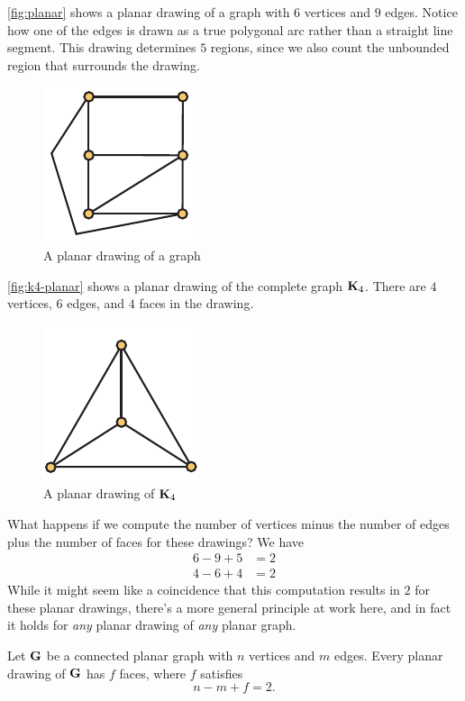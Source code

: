 \autoref{fig:planar} shows a planar drawing of a graph with $6$
vertices and $9$ edges. Notice how one of the edges is drawn as a true
polygonal arc rather than a straight line segment. This drawing
determines $5$ regions, since we also count the unbounded region that
surrounds the drawing.
\begin{figure}[b]
  \centering
  \includegraphics{graphs-figs/planar_graph}
  \caption{A planar drawing of a graph}
  \label{fig:planar}
\end{figure}
\autoref{fig:k4-planar} shows a planar drawing of the complete graph
$\mathbf{K}_4$. There are $4$ vertices, $6$ edges, and $4$ faces in the
drawing.
\begin{figure}[ht]
  \centering
  \includegraphics{graphs-figs/k4_planar}
  \caption{A planar drawing of $\mathbf{K}_4$}
  \label{fig:k4-planar}
\end{figure}
What happens if we compute the number of vertices minus the number of
edges plus the number of faces for these drawings? We have
\begin{align*}
  6-9+5 &= 2\\
  4-6+4 &=2
\end{align*}
While it might seem like a coincidence that this computation results
in $2$ for these planar drawings, there's a more general principle at
work here, and in fact it holds for \emph{any} planar drawing of
\emph{any} planar graph.

\begin{theorem}[Euler]
  Let $\mathbf{G}$ be a connected planar graph with $n$ vertices and $m$
  edges. Every planar drawing of $\mathbf{G}$ has $f$ faces, where $f$
  satisfies
  \[n-m+f=2.\]
\end{theorem}

